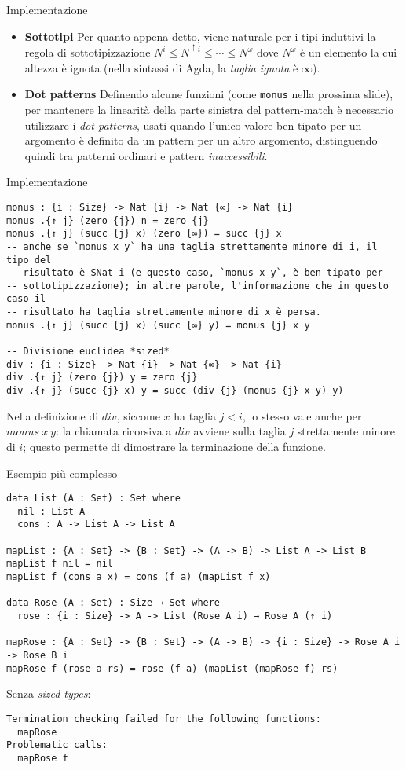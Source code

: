 \documentclass[t,aspectratio=169,9pt]{beamer}
\begin{document}
\begin{frame}{Implementazione}
	\begin{itemize}
		\item {{\bf Sottotipi}
		      Per quanto appena detto, viene naturale per i tipi induttivi la regola
		      di sottotipizzazione $N^i \leq N^{\uparrow i} \leq \cdots \leq
			      N^{\omega}$ dove $N^{\omega}$ è un elemento la cui altezza è ignota
		      (nella sintassi di Agda, la {\it taglia ignota} è $\infty$).
		      }
		\item {{\bf Dot patterns}
		      Definendo alcune funzioni (come \texttt{monus} nella prossima slide),
		      per mantenere la linearità della parte sinistra del pattern-match è
		      necessario utilizzare i {\it dot patterns}, usati quando l'unico valore ben
		      tipato per un argomento è definito da un pattern per un altro argomento,
		      distinguendo quindi tra patterni ordinari e pattern {\it inaccessibili}.
		      }
	\end{itemize}
\end{frame}
\begin{frame}[fragile]{Implementazione}
	\begin{verbatim}
monus : {i : Size} -> Nat {i} -> Nat {∞} -> Nat {i}
monus .{↑ j} (zero {j}) n = zero {j}
monus .{↑ j} (succ {j} x) (zero {∞}) = succ {j} x
-- anche se `monus x y` ha una taglia strettamente minore di i, il tipo del
-- risultato è SNat i (e questo caso, `monus x y`, è ben tipato per
-- sottotipizzazione); in altre parole, l'informazione che in questo caso il
-- risultato ha taglia strettamente minore di x è persa. 
monus .{↑ j} (succ {j} x) (succ {∞} y) = monus {j} x y

-- Divisione euclidea *sized*
div : {i : Size} -> Nat {i} -> Nat {∞} -> Nat {i}
div .{↑ j} (zero {j}) y = zero {j}
div .{↑ j} (succ {j} x) y = succ (div {j} (monus {j} x y) y)
\end{verbatim}
	Nella definizione di $div$, siccome $x$ ha taglia $j < i$, lo stesso vale anche
	per $monus~x~y$: la chiamata ricorsiva a $div$ avviene sulla taglia $j$
	strettamente minore di $i$; questo permette di dimostrare la terminazione della
	funzione.
\end{frame}
\begin{frame}[fragile]{Esempio più complesso}
	\begin{verbatim}
data List (A : Set) : Set where
  nil : List A 
  cons : A -> List A -> List A

mapList : {A : Set} -> {B : Set} -> (A -> B) -> List A -> List B
mapList f nil = nil 
mapList f (cons a x) = cons (f a) (mapList f x)

data Rose (A : Set) : Size → Set where
  rose : {i : Size} -> A -> List (Rose A i) → Rose A (↑ i)

mapRose : {A : Set} -> {B : Set} -> (A -> B) -> {i : Size} -> Rose A i -> Rose B i
mapRose f (rose a rs) = rose (f a) (mapList (mapRose f) rs)
\end{verbatim}
	Senza {\it sized-types}:
	\begin{verbatim}
Termination checking failed for the following functions:
  mapRose
Problematic calls:
  mapRose f
\end{verbatim}
\end{frame}
\end{document}
